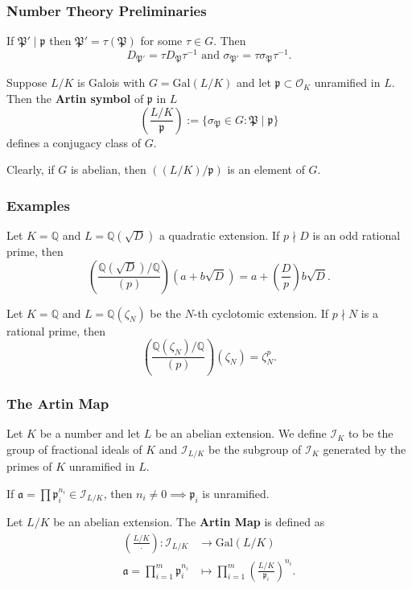 \documentclass{beamer}
\newcommand{\Gal}{\mathrm{Gal}}
\newcommand{\PP}{\mathfrak{P}}
\newcommand{\QQ}{\mathbb{Q}}
\newcommand{\pp}{\mathfrak{p}}
\newcommand{\af}{\mathfrak{a}}
\theoremstyle{plain}
\begin{document}
\begin{frame}
    \frametitle{Number Theory Preliminaries}
    If $\PP'\mid\pp$ then $\PP'=\tau(\PP)$ for some $\tau\in G$. Then 
    $$D_{\PP'}=\tau D_{\PP}\tau^{-1}\text{  and  } \sigma_{\PP'}=\tau\sigma_{\PP}\tau^{-1}.$$
    \pause
    \begin{definition}
        Suppose $L/K$ is Galois with $G=\Gal(L/K)$ and let $\pp\subset\mathcal{O}_K$ unramified in $L$. Then the \textbf{Artin symbol} of $\pp$ in $L$ $$\left(\frac{L/K}{\pp}\right):=\{\sigma_\PP\in G:\PP\mid\pp\}$$ defines a conjugacy class of $G$.
    \end{definition}
    Clearly, if $G$ is abelian, then $((L/K)/\pp)$ is an element of $G$.
\end{frame}

\begin{frame}
    \frametitle{Examples}
    \begin{example}
        Let $K=\QQ$ and $L=\QQ(\sqrt{D})$ a quadratic extension. If $p\nmid D$ is an odd rational prime, then
        $$\left(\frac{\QQ(\sqrt{D})/\QQ}{(p)}\right)(a+b\sqrt{D})=a+\left(\frac{D}{p}\right)b\sqrt{D}.$$
    \end{example}
    \begin{example}
        Let $K=\QQ$ and $L=\QQ(\zeta_N)$ be the $N$-th cyclotomic extension. If $p\nmid N$ is a rational prime, then
        $$\left(\frac{\QQ(\zeta_N)/\QQ}{(p)}\right)(\zeta_N)=\zeta_N^p.$$
    \end{example}

\end{frame}


\begin{frame}
    \frametitle{The Artin Map}
    \begin{definition}
        Let $K$ be a number and let $L$ be an abelian extension. We define $\mathcal{I}_K$ to be the group of fractional ideals of $K$ and $\mathcal{I}_{L/K}$ be the subgroup of $\mathcal{I}_K$ generated by the primes of $K$ unramified in $L$.
    \end{definition}
    If $\af=\prod \pp_i^{n_i}\in\mathcal{I}_{L/K}$, then $n_i\neq 0\implies \pp_i$ is unramified.
    \begin{definition}
        Let $L/K$ be an abelian extension. The \textbf{Artin Map} is defined as 
        \begin{align*}
            \left(\frac{L/K}{\cdot}\right):\mathcal{I}_{L/K}&\longrightarrow\Gal(L/K) \\
            \af=\prod_{i=1}^m \pp_i^{n_i}&\longmapsto \prod_{i=1}^m\left(\frac{L/K}{\pp_i}\right)^{n_i}.
        \end{align*}
    \end{definition}
\end{frame}
\end{document}
